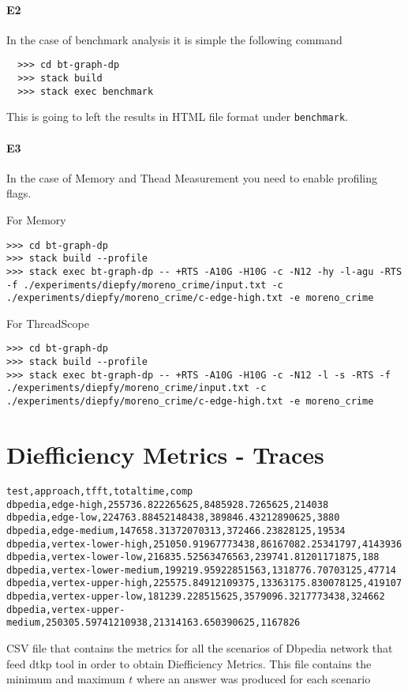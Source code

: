 \paragraph{E2} In the case of benchmark analysis it is simple the following command
\begin{verbatim}
  >>> cd bt-graph-dp
  >>> stack build
  >>> stack exec benchmark
  \end{verbatim}

\setlength{\rightskip}{0pt plus 1 fil}
This is going to left the results in HTML file format under \texttt{benchmark}.


\paragraph{E3} In the case of Memory and Thead Measurement you need to enable profiling flags.

For Memory
\begin{verbatim}
>>> cd bt-graph-dp
>>> stack build --profile
>>> stack exec bt-graph-dp -- +RTS -A10G -H10G -c -N12 -hy -l-agu -RTS -f ./experiments/diepfy/moreno_crime/input.txt -c ./experiments/diepfy/moreno_crime/c-edge-high.txt -e moreno_crime
\end{verbatim}

For ThreadScope
\begin{verbatim}
>>> cd bt-graph-dp
>>> stack build --profile
>>> stack exec bt-graph-dp -- +RTS -A10G -H10G -c -N12 -l -s -RTS -f ./experiments/diepfy/moreno_crime/input.txt -c ./experiments/diepfy/moreno_crime/c-edge-high.txt -e moreno_crime
\end{verbatim}

\section{Diefficiency Metrics - Traces}\label{apx:traces}

\begin{listing}[H]
\begin{verbatim}
test,approach,tfft,totaltime,comp
dbpedia,edge-high,255736.822265625,8485928.7265625,214038
dbpedia,edge-low,224763.88452148438,389846.43212890625,3880
dbpedia,edge-medium,147658.31372070313,372466.23828125,19534
dbpedia,vertex-lower-high,251050.91967773438,86167082.25341797,4143936
dbpedia,vertex-lower-low,216835.52563476563,239741.81201171875,188
dbpedia,vertex-lower-medium,199219.95922851563,1318776.70703125,47714
dbpedia,vertex-upper-high,225575.84912109375,13363175.830078125,419107
dbpedia,vertex-upper-low,181239.228515625,3579096.3217773438,324662
dbpedia,vertex-upper-medium,250305.59741210938,21314163.650390625,1167826
\end{verbatim}  
\caption[{[\texttt{metrics.csv}] Metrics CSV Dbpedia}]{CSV file that contains the metrics for all the scenarios of Dbpedia network that feed \acrshort{dtkp} tool in order to obtain Diefficiency Metrics. This file contains the minimum and maximum $t$ where an answer was produced for each scenario}
\label{apx:metrics:csv}
\end{listing}

